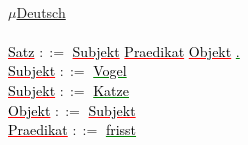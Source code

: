 \documentclass[18pt,a4paper]{scrreprt}
\begin{document}
\\
\uline{$\mu$Deutsch}\\
\\
\textcolor{red}{\uline{\textcolor{black}{Satz}}} $::=$ \textcolor{red}{\uline{\textcolor{black}{Subjekt}}} \textcolor{red}{\uline{\textcolor{black}{Praedikat}}} \textcolor{red}{\uline{\textcolor{black}{Objekt}}} \textcolor{green}{\uline{\textcolor{black}{.}}}\\
\textcolor{red}{\uline{\textcolor{black}{Subjekt}}} $::=$ \textcolor{green}{\uline{\textcolor{black}{Vogel}}}\\ 
\textcolor{red}{\uline{\textcolor{black}{Subjekt}}} $::=$ \textcolor{green}{\uline{\textcolor{black}{Katze}}}\\
\textcolor{red}{\uline{\textcolor{black}{Objekt}}} $::=$ \textcolor{red}{\uline{\textcolor{black}{Subjekt}}}\\
\textcolor{red}{\uline{\textcolor{black}{Praedikat}}} $::=$ \textcolor{green}{\uline{\textcolor{black}{frisst}}}\\
\end{document}
